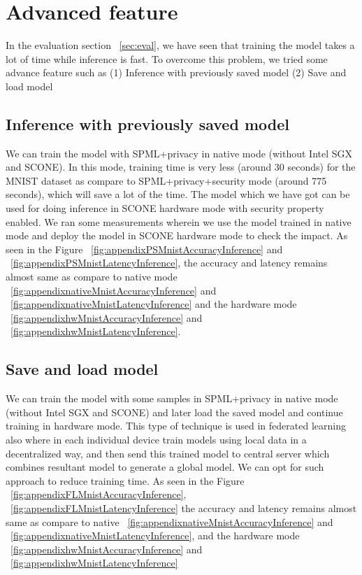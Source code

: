 \section{Advanced feature}
In the evaluation section ~\ref{sec:eval}, we have seen that training the model takes a lot of time while inference is fast. To overcome this problem, we tried some advance feature such as (1) Inference with previously saved model (2) Save and load model

\subsection{Inference with previously saved model}
\label{sec:appIO}
We can train the model with SPML+privacy in native mode (without Intel SGX and SCONE). In this mode, training time is very less (around 30 seconds) for the MNIST dataset as compare to SPML+privacy+security mode (around 775 seconds), which will save a lot of the time. The model which we have got can be used for doing inference in SCONE hardware mode with security property enabled. We ran some measurements wherein we use the model trained in native mode and deploy the model in SCONE hardware mode to check the impact. As seen in the Figure  ~\ref{fig:appendixPSMnistAccuracyInference} and ~\ref{fig:appendixPSMnistLatencyInference}, the accuracy and latency remains almost same as compare to native mode ~\ref{fig:appendixnativeMnistAccuracyInference} and ~\ref{fig:appendixnativeMnistLatencyInference} and the hardware mode ~\ref{fig:appendixhwMnistAccuracyInference} and ~\ref{fig:appendixhwMnistLatencyInference}.

\subsection{Save and load model}
\label{sec:appNHmode}
We can train the model with some samples in SPML+privacy in native mode (without Intel SGX and SCONE) and later load the saved model and continue training in hardware mode. This type of technique is used in federated learning also where in each individual device train models using local data in a decentralized way, and then send this trained model to central server which combines resultant model to generate a global model. We can opt for such approach to reduce training time.
As seen in the Figure ~\ref{fig:appendixFLMnistAccuracyInference},  ~\ref{fig:appendixFLMnistLatencyInference} the accuracy and latency remains almost same as compare to native ~\ref{fig:appendixnativeMnistAccuracyInference} and ~\ref{fig:appendixnativeMnistLatencyInference}, and the hardware mode ~\ref{fig:appendixhwMnistAccuracyInference} and ~\ref{fig:appendixhwMnistLatencyInference}


